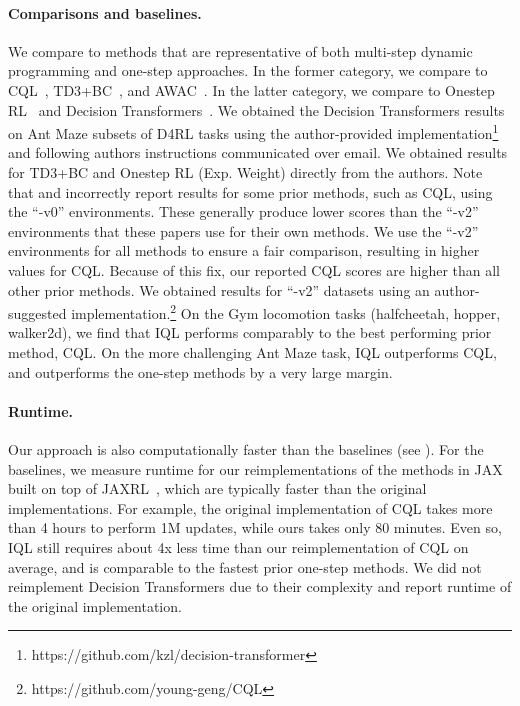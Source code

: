 \documentclass{article} %
\def\ourname{IQL\xspace}
\begin{document}
\paragraph{Comparisons and baselines.} We compare to methods that are representative of both multi-step dynamic programming and one-step approaches. In the former category, we compare to CQL~\citep{kumar2020conservative}, TD3+BC~\citep{fujimoto2021minimalist}, and AWAC~\citep{nair2020awac}. In the latter category, we compare to Onestep RL~\citep{brandfonbrener2021offline} and Decision Transformers~\citep{chen2021decision}. We obtained the Decision Transformers results on Ant Maze subsets of D4RL tasks using the author-provided implementation\footnote{https://github.com/kzl/decision-transformer} and following authors instructions communicated over email. We obtained results for TD3+BC and Onestep RL (Exp. Weight) directly from the authors. Note that \citet{chen2021decision} and \citet{brandfonbrener2021offline}
incorrectly report results for some prior methods, such as CQL, using the ``-v0'' environments. These generally produce lower scores than the ``-v2'' environments that these papers use for their own methods. We use the ``-v2'' environments for all methods to ensure a fair comparison, resulting in higher values for CQL. Because of this fix, our reported CQL scores are higher than all other prior methods. We obtained results for ``-v2'' datasets using an author-suggested implementation.\footnote{https://github.com/young-geng/CQL}
On the Gym locomotion tasks (halfcheetah, hopper, walker2d), we find that \ourname performs comparably to the best performing prior method, CQL. On the more challenging Ant Maze task, \ourname outperforms CQL, and outperforms the one-step methods by a very large margin.


\paragraph{Runtime.} Our approach is also computationally faster than the baselines (see ). For the baselines, we measure runtime for our reimplementations of the methods in JAX~\citep{jax2018github} built on top of JAXRL~\citep{jaxrl}, which are typically faster than the original implementations. For example, the original implementation of CQL takes more than 4 hours to perform 1M updates, while ours takes only 80 minutes. Even so, \ourname still requires about 4x less time than our reimplementation of CQL on average, and is comparable to the fastest prior one-step methods. We did not reimplement Decision Transformers due to their complexity and report runtime of the original implementation.
\end{document}
